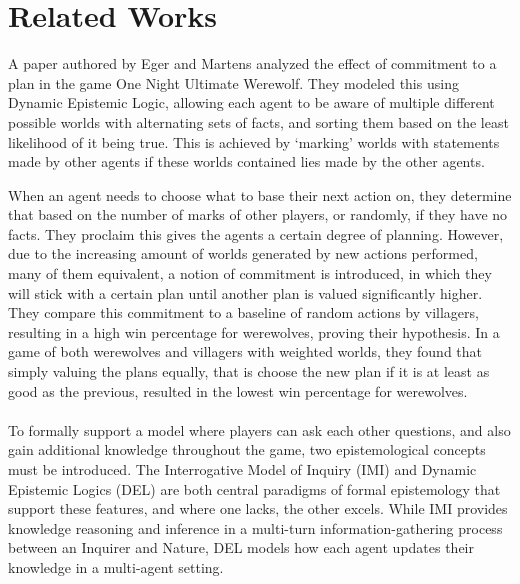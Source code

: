\section{Related Works}
A paper authored by Eger and Martens\cite{commitment} analyzed the effect of
commitment to a plan in the game One Night Ultimate Werewolf. They modeled this
using Dynamic Epistemic Logic, allowing each agent to be aware of multiple
different possible worlds with alternating sets of facts, and sorting them
based on the least likelihood of it being true. This is achieved by ‘marking’
worlds with statements made by other agents if these worlds contained lies made
by the other agents.

When an agent needs to choose what to base their next action on, they determine
that based on the number of marks of other players, or randomly, if they have
no facts. They proclaim this gives the agents a certain degree of planning.
However, due to the increasing amount of worlds generated by new actions
performed, many of them equivalent, a notion of commitment is introduced, in
which they will stick with a certain plan until another plan is valued
significantly higher. They compare this commitment to a baseline of random
actions by villagers, resulting in a high win percentage for werewolves,
proving their hypothesis. In a game of both werewolves and villagers with
weighted worlds, they found that simply valuing the plans equally, that is
choose the new plan if it is at least as good as the previous, resulted in the
lowest win percentage for werewolves.\\ \\ To formally support a model where
players can ask each other questions, and also gain additional knowledge
throughout the game, two epistemological concepts must be introduced. The
Interrogative Model of Inquiry (IMI) and Dynamic Epistemic Logics (DEL) are
both central paradigms of formal epistemology that support these features, and
where one lacks, the other excels. While IMI provides knowledge reasoning and
inference in a multi-turn information-gathering process between an Inquirer and
Nature, DEL models how each agent updates their knowledge in a multi-agent
setting.


